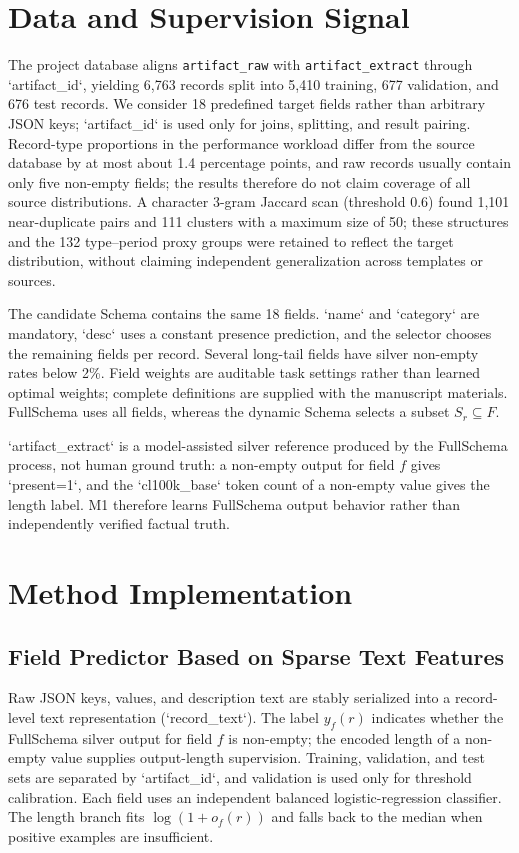 \documentclass[runningheads]{llncs}
\newcommand{\method}{M1}
\newcommand{\full}{FullSchema}
\begin{document}
\section{Data and Supervision Signal}

The project database aligns \texttt{artifact\allowbreak\_raw} with \texttt{artifact\allowbreak\_extract} through `artifact_id`, yielding 6,763 records split into 5,410 training, 677 validation, and 676 test records. We consider 18 predefined target fields rather than arbitrary JSON keys; `artifact_id` is used only for joins, splitting, and result pairing. Record-type proportions in the performance workload differ from the source database by at most about 1.4 percentage points, and raw records usually contain only five non-empty fields; the results therefore do not claim coverage of all source distributions. A character 3-gram Jaccard scan (threshold 0.6) found 1,101 near-duplicate pairs and 111 clusters with a maximum size of 50; these structures and the 132 type--period proxy groups were retained to reflect the target distribution, without claiming independent generalization across templates or sources.

The candidate Schema contains the same 18 fields. `name` and `category` are mandatory, `desc` uses a constant presence prediction, and the selector chooses the remaining fields per record. Several long-tail fields have silver non-empty rates below 2\%. Field weights are auditable task settings rather than learned optimal weights; complete definitions are supplied with the manuscript materials. \full{} uses all fields, whereas the dynamic Schema selects a subset $S_r\subseteq F$.

`artifact_extract` is a model-assisted silver reference produced by the \full{} process, not human ground truth: a non-empty output for field $f$ gives `present=1`, and the `cl100k_base` token count of a non-empty value gives the length label. \method{} therefore learns \full{} output behavior rather than independently verified factual truth.

\section{Method Implementation}
\subsection{Field Predictor Based on Sparse Text Features}

Raw JSON keys, values, and description text are stably serialized into a record-level text representation (`record_text`). The label $y_f(r)$ indicates whether the \full{} silver output for field $f$ is non-empty; the encoded length of a non-empty value supplies output-length supervision. Training, validation, and test sets are separated by `artifact_id`, and validation is used only for threshold calibration. Each field uses an independent balanced logistic-regression classifier. The length branch fits $\log(1+o_f(r))$ and falls back to the median when positive examples are insufficient.
\end{document}
